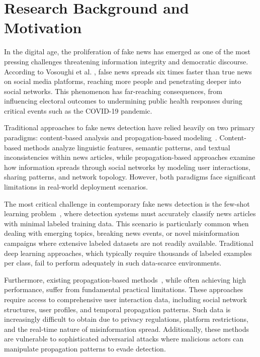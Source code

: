 
\section{Research Background and Motivation}

In the digital age, the proliferation of fake news has emerged as one of the most pressing challenges threatening information integrity and democratic discourse. According to Vosoughi et al. \cite{vosoughi2018spread}, false news spreads six times faster than true news on social media platforms, reaching more people and penetrating deeper into social networks. This phenomenon has far-reaching consequences, from influencing electoral outcomes to undermining public health responses during critical events such as the COVID-19 pandemic.

Traditional approaches to fake news detection have relied heavily on two primary paradigms: content-based analysis and propagation-based modeling~\cite{zhou2020survey}. Content-based methods analyze linguistic features, semantic patterns, and textual inconsistencies within news articles, while propagation-based approaches examine how information spreads through social networks by modeling user interactions, sharing patterns, and network topology. However, both paradigms face significant limitations in real-world deployment scenarios.

The most critical challenge in contemporary fake news detection is the few-shot learning problem~\cite{wang2020fewshot}, where detection systems must accurately classify news articles with minimal labeled training data. This scenario is particularly common when dealing with emerging topics, breaking news events, or novel misinformation campaigns where extensive labeled datasets are not readily available. Traditional deep learning approaches, which typically require thousands of labeled examples per class, fail to perform adequately in such data-scarce environments.

Furthermore, existing propagation-based methods~\cite{shu2017fake}, while often achieving high performance, suffer from fundamental practical limitations. These approaches require access to comprehensive user interaction data, including social network structures, user profiles, and temporal propagation patterns. Such data is increasingly difficult to obtain due to privacy regulations, platform restrictions, and the real-time nature of misinformation spread. Additionally, these methods are vulnerable to sophisticated adversarial attacks where malicious actors can manipulate propagation patterns to evade detection.

